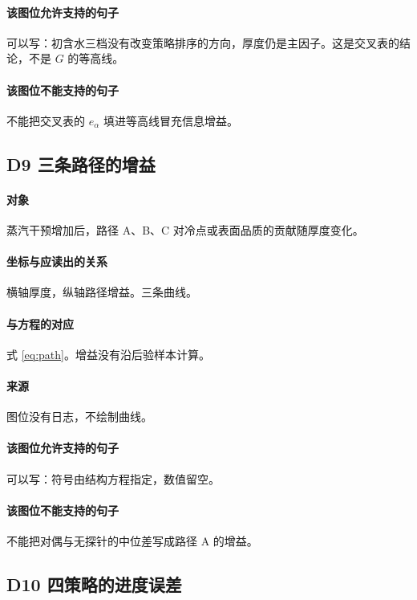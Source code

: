 \paragraph{该图位允许支持的句子}
可以写：初含水三档没有改变策略排序的方向，厚度仍是主因子。这是交叉表的结论，不是 $G$ 的等高线。

\paragraph{该图位不能支持的句子}
不能把交叉表的 $e_\alpha$ 填进等高线冒充信息增益。

\subsection{D9 三条路径的增益}
\paragraph{对象}
蒸汽干预增加后，路径 A、B、C 对冷点或表面品质的贡献随厚度变化。

\paragraph{坐标与应读出的关系}
横轴厚度，纵轴路径增益。三条曲线。

\paragraph{与方程的对应}
式 \eqref{eq:path}。增益没有沿后验样本计算。

\paragraph{来源}
图位没有日志，不绘制曲线。

\paragraph{该图位允许支持的句子}
可以写：符号由结构方程指定，数值留空。

\paragraph{该图位不能支持的句子}
不能把对偶与无探针的中位差写成路径 A 的增益。

\subsection{D10 四策略的进度误差}
